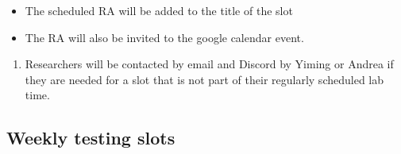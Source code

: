 \documentclass[]{article}
\providecommand{\tightlist}{%
  \setlength{\itemsep}{0pt}\setlength{\parskip}{0pt}}
\begin{document}
\begin{itemize}
\tightlist
\item
  The scheduled RA will be added to the title of the slot
\item
  The RA will also be invited to the google calendar event.
\end{itemize}

\begin{enumerate}
\def\labelenumi{\arabic{enumi}.}
\setcounter{enumi}{3}
\tightlist
\item
  Researchers will be contacted by email and Discord by Yiming or Andrea
  if they are needed for a slot that is not part of their regularly
  scheduled lab time.
\end{enumerate}

\hypertarget{weekly-testing-slots}{%
\subsection{Weekly testing slots}\label{weekly-testing-slots}}
\end{document}
